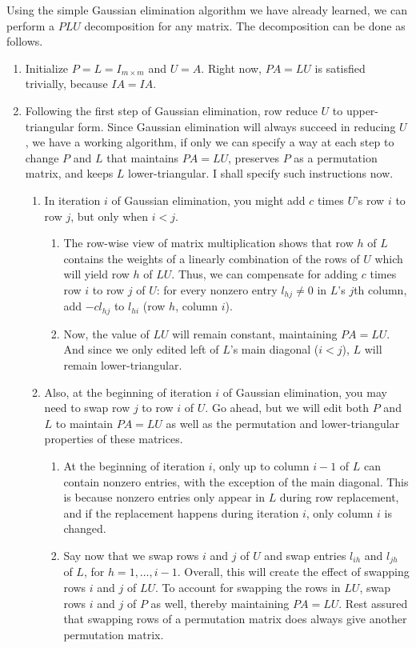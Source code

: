 \documentclass[draft,12pt]{report}
\begin{document}
Using the simple Gaussian elimination algorithm we have already learned, we can perform a $PLU$ decomposition for any matrix. The decomposition can be done as follows.
\begin{enumerate}
    \item Initialize $P = L = I_{m \times m}$ and $U = A$. Right now, $PA = LU$ is satisfied trivially, because $IA = IA$.
    \item Following the first step of Gaussian elimination, row reduce $U$ to upper-triangular form. Since Gaussian elimination will always succeed in reducing $U$, we have a working algorithm, if only we can specify a way at each step to change $P$ and $L$ that maintains $PA = LU$, preserves $P$ as a permutation matrix, and keeps $L$ lower-triangular. I shall specify such instructions now.
    \begin{enumerate}
        \item In iteration $i$ of Gaussian elimination, you might add $c$ times $U$'s row $i$ to row $j$, but only when $i < j$.
        \begin{enumerate}
            \item The row-wise view of matrix multiplication shows that row $h$ of $L$ contains the weights of a linearly combination of the rows of $U$ which will yield row $h$ of $LU$. Thus, we can compensate for adding $c$ times row $i$ to row $j$ of $U$: for every nonzero entry $l_{hj} \neq 0$ in $L$'s $j$th column, add $-c l_{hj}$ to $l_{hi}$ (row $h$, column $i$).
            \item Now, the value of $LU$ will remain constant, maintaining $PA = LU$. And since we only edited left of $L$'s main diagonal ($i < j$), $L$ will remain lower-triangular.
        \end{enumerate}
        \item Also, at the beginning of iteration $i$ of Gaussian elimination, you may need to swap row $j$ to row $i$ of $U$. Go ahead, but we will edit both $P$ and $L$ to maintain $PA = LU$ as well as the permutation and lower-triangular properties of these matrices.
        \begin{enumerate}
            \item At the beginning of iteration $i$, only up to column $i - 1$ of $L$ can contain nonzero entries, with the exception of the main diagonal. This is because nonzero entries only appear in $L$ during row replacement, and if the replacement happens during iteration $i$, only column $i$ is changed.
            \item Say now that we swap rows $i$ and $j$ of $U$ and swap entries $l_{ih}$ and $l_{jh}$ of $L$, for $h = 1, \ldots, i - 1$. Overall, this will create the effect of swapping rows $i$ and $j$ of $LU$. To account for swapping the rows in $LU$, swap rows $i$ and $j$ of $P$ as well, thereby maintaining $PA = LU$. Rest assured that swapping rows of a permutation matrix does always give another permutation matrix.

\end{enumerate}
\end{enumerate}
\end{enumerate}
\end{document}
